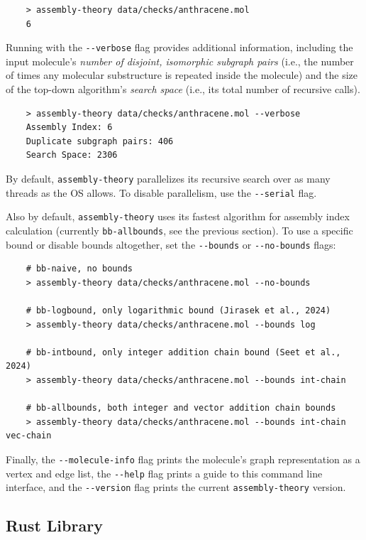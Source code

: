 \documentclass[acmsmall,nonacm,screen]{acmart}  %
\begin{document}
\begin{verbatim}
    > assembly-theory data/checks/anthracene.mol
    6
\end{verbatim}

Running with the \verb|--verbose| flag provides additional information, including the input molecule's \textit{number of disjoint, isomorphic subgraph pairs} (i.e., the number of times any molecular substructure is repeated inside the molecule) and the size of the top-down algorithm's \textit{search space} (i.e., its total number of recursive calls).

\begin{verbatim}
    > assembly-theory data/checks/anthracene.mol --verbose
    Assembly Index: 6
    Duplicate subgraph pairs: 406
    Search Space: 2306
\end{verbatim}

By default, \texttt{assembly-theory} parallelizes its recursive search over as many threads as the OS allows.
To disable parallelism, use the \verb|--serial| flag.

Also by default, \texttt{assembly-theory} uses its fastest algorithm for assembly index calculation (currently \texttt{bb-allbounds}, see the previous section).
To use a specific bound or disable bounds altogether, set the \verb|--bounds| or \verb|--no-bounds| flags:

\begin{verbatim}
    # bb-naive, no bounds
    > assembly-theory data/checks/anthracene.mol --no-bounds

    # bb-logbound, only logarithmic bound (Jirasek et al., 2024)
    > assembly-theory data/checks/anthracene.mol --bounds log

    # bb-intbound, only integer addition chain bound (Seet et al., 2024)
    > assembly-theory data/checks/anthracene.mol --bounds int-chain

    # bb-allbounds, both integer and vector addition chain bounds
    > assembly-theory data/checks/anthracene.mol --bounds int-chain vec-chain
\end{verbatim}

Finally, the \verb|--molecule-info| flag prints the molecule's graph representation as a vertex and edge list, the \verb|--help| flag prints a guide to this command line interface, and the \verb|--version| flag prints the current \texttt{assembly-theory} version.



\subsection{Rust Library} \label{subsec:rustlibrary}
\end{document}
